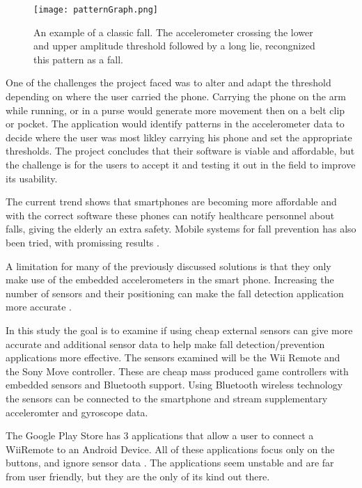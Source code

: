 \begin{figure}[h!]
  \centering
    \texttt{[image: patternGraph.png]}
    \caption{\footnotesize An example of a classic fall. The accelerometer crossing the lower and upper amplitude  threshold followed by a long lie, recongnized this pattern as a fall.}
\end{figure}

One of the challenges the project faced was to alter and adapt the threshold depending on where the user carried the phone. Carrying the phone on the arm while running, or in a purse would generate more movement then on a belt clip or pocket. The application would identify patterns in the accelerometer data to decide where the user was most likley carrying his phone and set the appropriate thresholds. The project concludes that their software is viable and affordable, but the challenge is for the users to accept it and testing it out in the field to improve its usability.




The current trend shows that smartphones are becoming more affordable \cite{find_some_data_here} and with the correct software these phones can notify healthcare personnel about falls, giving the elderly an extra safety. Mobile systems for fall prevention has also been tried, with promissing results \cite{fallPrevention}.

A limitation for many of the previously discussed solutions is that they only make use of the embedded accelerometers in the smart phone. Increasing the number of sensors and their positioning can make the fall detection application more accurate \cite{fallDetectionWithExtraSensors}. 

In this study the goal is to examine if using cheap external sensors can give more accurate and additional sensor data to help make fall detection/prevention applications more effective. The sensors examined will be the Wii Remote and the Sony Move controller. These are cheap mass produced game controllers with embedded sensors and Bluetooth support. Using Bluetooth wireless technology the sensors can be connected to the smartphone and stream supplementary acceleromter and gyroscope data.

The Google Play Store has 3 applications that allow a user to connect a WiiRemote to an Android Device. All of these applications focus only on the buttons, and ignore sensor data \cite{wiimoteController, simpleWiiController}. The applications seem unstable and are far from user friendly, but they are the only of its kind out there.

